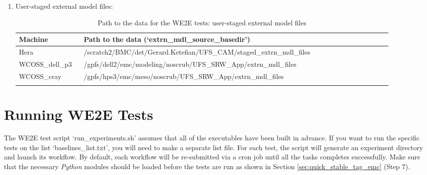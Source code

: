 \documentclass[11pt,fleqn]{report}              %
\begin{document}
\begin{enumerate}
\item User-staged external model files:
{
\fontsize{10}{12}\selectfont
\begin{longtable}{p{0.16\linewidth} | p{0.76\linewidth} }
\hline
\hline
Machine & Path to the data (`extrn\_mdl\_source\_basedir') \\
\hline
 Hera & /scratch2/BMC/det/Gerard.Ketefian/UFS\_CAM/staged\_extrn\_mdl\_files \\
 WCOSS\_dell\_p3 & /gpfs/dell2/emc/modeling/noscrub/UFS\_SRW\_App/extrn\_mdl\_files \\
 WCOSS\_cray & /gpfs/hps3/emc/meso/noscrub/UFS\_SRW\_App/extrn\_mdl\_files \\
\hline
\caption{Path to the data for the WE2E tests: user-staged external model files}
\label{table:path_data_we2e_userstaged_ext}
\end{longtable}
}

\end{enumerate}



\section{Running WE2E Tests}
\label{sec:we2e_run}

The WE2E test script `run\_experiments.sh' assumes that all of the executables have been built in advance. If you want to run the specific tests on the list `baselines\_list.txt', you will need to make a separate list file. For each test, the script will generate an experiment directory and launch its workflow. By default, each workflow will be re-submitted via a cron job until all the tasks completes successfully. Make sure that the necessary {\it Python} modules should be loaded before the tests are run as shown in Section \ref{sec:quick_stable_tag_emc} (Step 7).
\end{document}
